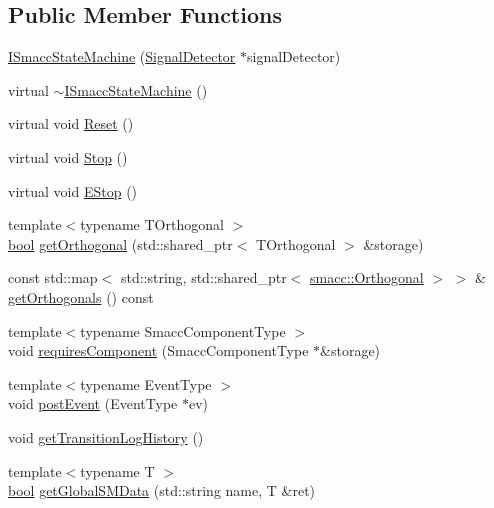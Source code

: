 \subsection*{Public Member Functions}
\begin{DoxyCompactItemize}
\item 
\hyperlink{classsmacc_1_1ISmaccStateMachine_a497c2185584adbec3298d4000277b75e}{I\+Smacc\+State\+Machine} (\hyperlink{classsmacc_1_1SignalDetector}{Signal\+Detector} $\ast$signal\+Detector)
\item 
virtual \hyperlink{classsmacc_1_1ISmaccStateMachine_a54bb9bac0008d3efc6a50cce88dce48e}{$\sim$\+I\+Smacc\+State\+Machine} ()
\item 
virtual void \hyperlink{classsmacc_1_1ISmaccStateMachine_ae175edef7aba48a1ac82e8401632c5fa}{Reset} ()
\item 
virtual void \hyperlink{classsmacc_1_1ISmaccStateMachine_a8f353fcf0686b1dacb57458da882c89b}{Stop} ()
\item 
virtual void \hyperlink{classsmacc_1_1ISmaccStateMachine_a3c5aab001d1bb7edcb37413404e4a7c2}{E\+Stop} ()
\item 
{\footnotesize template$<$typename T\+Orthogonal $>$ }\\\hyperlink{classbool}{bool} \hyperlink{classsmacc_1_1ISmaccStateMachine_a66a6732a48dbc0bc7a95b57fba5ec980}{get\+Orthogonal} (std\+::shared\+\_\+ptr$<$ T\+Orthogonal $>$ \&storage)
\item 
const std\+::map$<$ std\+::string, std\+::shared\+\_\+ptr$<$ \hyperlink{classsmacc_1_1Orthogonal}{smacc\+::\+Orthogonal} $>$ $>$ \& \hyperlink{classsmacc_1_1ISmaccStateMachine_a262b3f2d15af019190fa69b7c0df00f8}{get\+Orthogonals} () const 
\item 
{\footnotesize template$<$typename Smacc\+Component\+Type $>$ }\\void \hyperlink{classsmacc_1_1ISmaccStateMachine_aa6b25e28f3bce24c4b356dc865a9eb7b}{requires\+Component} (Smacc\+Component\+Type $\ast$\&storage)
\item 
{\footnotesize template$<$typename Event\+Type $>$ }\\void \hyperlink{classsmacc_1_1ISmaccStateMachine_ad80cdd7bbc9a9f3b221c625754fed1ed}{post\+Event} (Event\+Type $\ast$ev)
\item 
void \hyperlink{classsmacc_1_1ISmaccStateMachine_ae7c08fc2addf8ee4785f721050e6a763}{get\+Transition\+Log\+History} ()
\item 
{\footnotesize template$<$typename T $>$ }\\\hyperlink{classbool}{bool} \hyperlink{classsmacc_1_1ISmaccStateMachine_aeda2d6813c6c428bf318a5792e014b61}{get\+Global\+S\+M\+Data} (std\+::string name, T \&ret)

\end{DoxyCompactItemize}
